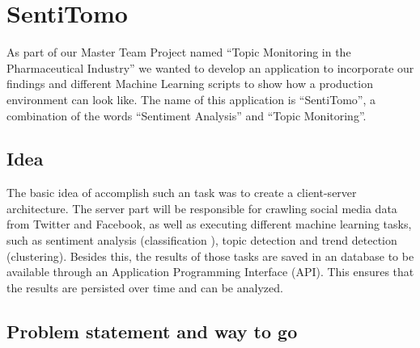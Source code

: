 \documentclass[]{article}
\date{}
\begin{document}
\section{SentiTomo}\label{sentitomo}

As part of our Master Team Project named ``Topic Monitoring in the
Pharmaceutical Industry'' we wanted to develop an application to
incorporate our findings and different Machine Learning scripts to show
how a production environment can look like. The name of this application
is ``SentiTomo'', a combination of the words ``Sentiment Analysis'' and
``Topic Monitoring''.

\subsection{Idea}\label{idea}

The basic idea of accomplish such an task was to create a client-server
architecture. The server part will be responsible for crawling social
media data from Twitter and Facebook, as well as executing different
machine learning tasks, such as sentiment analysis (classification ),
topic detection and trend detection (clustering). Besides this, the
results of those tasks are saved in an database to be available through
an Application Programming Interface (API). This ensures that the
results are persisted over time and can be analyzed.

\subsection{Problem statement and way to
go}\label{problem-statement-and-way-to-go}
\end{document}
